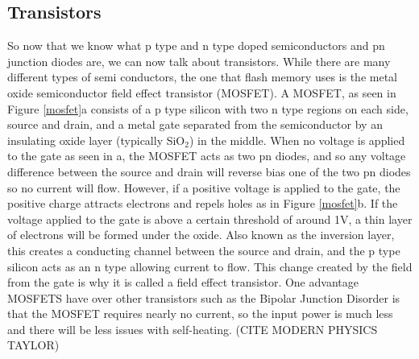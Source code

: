 \documentclass[ aip, 12pt]{revtex4-1} %
\begin{document}
\subsection{Transistors}
So now that we know what p type and n type doped semiconductors and pn junction diodes are, we can now talk about transistors. While there are many different types of semi conductors, the one that flash memory uses is the metal oxide semiconductor field effect transistor (MOSFET). A MOSFET, as seen in Figure \ref{mosfet}a consists of a p type silicon with two n type regions on each side, source and drain, and a metal gate separated from the semiconductor by an insulating oxide layer (typically SiO$_2$) in the middle. When no voltage is applied to the gate as seen in a, the MOSFET acts as two pn diodes, and so any voltage difference between the source and drain will reverse bias one of the two pn diodes so no current will flow. However, if a positive voltage is applied to the gate, the positive charge attracts electrons and repels holes as in Figure \ref{mosfet}b. If the voltage applied to the gate is above a certain threshold of around 1V, a thin layer of electrons will be formed under the oxide. Also known as the inversion layer, this creates a conducting channel between the source and drain, and the p type silicon acts as an n type allowing current to flow. This change created by the field from the gate is why it is called a field effect transistor. One advantage MOSFETS have over other transistors such as the Bipolar Junction Disorder is that the MOSFET requires nearly no current, so the input power is much less and there will be less issues with self-heating. (CITE MODERN PHYSICS TAYLOR)
\end{document}
